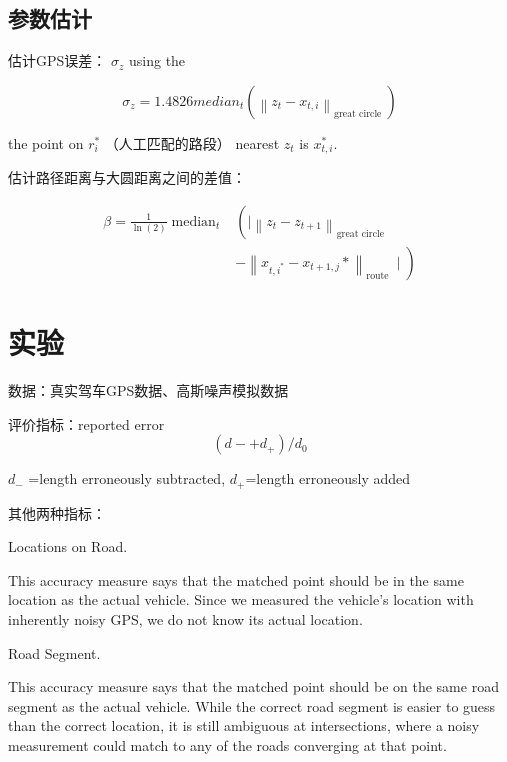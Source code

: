 \subsection{参数估计}

估计GPS误差：
$ \sigma_{z} $ using the 

\begin{equation} \sigma_{z}=1.4826 {median}_{{t}}\left(\left\|z_{t}-x_{t, i}\right\|_{\text {great circle }}\right) \end{equation}

the point on $ r_{i}^{*} $ （人工匹配的路段） nearest $ z_{t} $ is $ x_{t, i}^{*} $.

估计路径距离与大圆距离之间的差值：

\begin{equation} \begin{aligned} \beta=\frac{1}{\ln (2)} \operatorname{median}_{t} &\left(\mid\left\|z_{t}-z_{t+1}\right\|_{\text {great circle }}\right.\\ &\left.-\left\|x_{t, i^{*}}-x_{t+1, j} *\right\|_{\text {route }} \mid\right) \end{aligned} \end{equation}



\section{实验}

数据：真实驾车GPS数据、高斯噪声模拟数据

评价指标：reported error
  \begin{equation} \left({d}-+{d}_{+}\right) / {d}_{0} \end{equation} 

  $d_{-}  $ =length erroneously subtracted,
  $ d_{+} $=length erroneously added



其他两种指标：

  Locations on Road. 
  \begin{remark}
      This accuracy measure
  says that the matched point should be in the
  same location as the actual vehicle. Since we
  measured the vehicle's location with inherently
  noisy GPS, we do not know its actual location.
  \end{remark}

  Road Segment.
  \begin{remark}
      This accuracy measure says
  that the matched point should be on the same
  road segment as the actual vehicle. While the
  correct road segment is easier to guess than the
  correct location, it is still ambiguous at
  intersections, where a noisy measurement could
  match to any of the roads converging at that
  point.
  \end{remark}
  
   